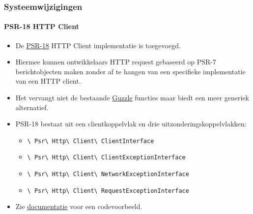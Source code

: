 
\begin{frame}[fragile]
	\frametitle{Systeemwijzigingen}
	\framesubtitle{PSR-18 HTTP Client}

	\begin{itemize}
		\item De \href{https://www.php-fig.org/psr/psr-18/}{PSR-18}
			HTTP Client implementatie is toegevoegd.
		\item Hiermee kunnen ontwikkelaars HTTP request gebaseerd op PSR-7 berichtobjecten
			maken zonder af te hangen van een specifieke implementatie van een HTTP client.
		\item Het vervangt niet de bestaande \href{http://guzzlephp.org/}{Guzzle}
			functies maar biedt een meer generiek alternatief.
		\item PSR-18 bestaat uit een clientkoppelvlak en drie uitzonderingskoppelvlakken:

			\begin{itemize}\smaller
				\item \texttt{\textbackslash
					Psr\textbackslash
					Http\textbackslash
					Client\textbackslash
					ClientInterface}
				\item \texttt{\textbackslash
					Psr\textbackslash
					Http\textbackslash
					Client\textbackslash
					ClientExceptionInterface}
				\item \texttt{\textbackslash
					Psr\textbackslash
					Http\textbackslash
					Client\textbackslash
					NetworkExceptionInterface}
				\item \texttt{\textbackslash
					Psr\textbackslash
					Http\textbackslash
					Client\textbackslash
					RequestExceptionInterface}
			\end{itemize}\normalsize

		\item Zie
			\href{https://docs.typo3.org/c/typo3/cms-core/master/en-us/Changelog/10.1/Feature-89216-PSR-18HTTPClientImplementation.html}{documentatie}
			voor een codevoorbeeld.

	\end{itemize}

\end{frame}


